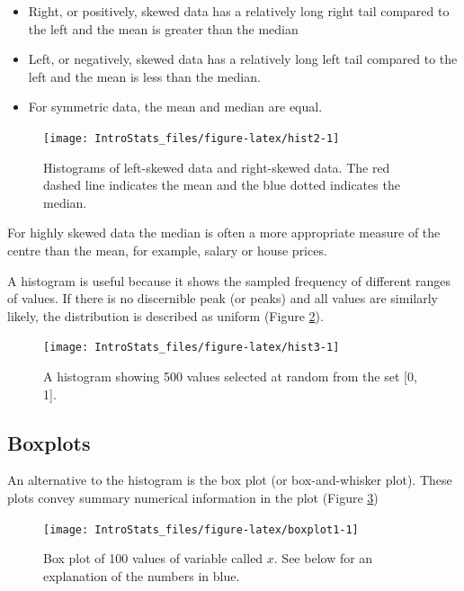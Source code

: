 \documentclass[
  oneside]{krantz}
\begin{document}
\begin{itemize}
\item
  Right, or positively, skewed data has a relatively long right tail compared to the left and the mean is greater than the median
\item
  Left, or negatively, skewed data has a relatively long left tail compared to the left and the mean is less than the median.
\item
  For symmetric data, the mean and median are equal.
\end{itemize}

\begin{figure}

{\centering \texttt{[image: IntroStats\_files/figure-latex/hist2-1]} 

}

\caption{Histograms of left-skewed data and right-skewed data. The red dashed line indicates the mean and the blue dotted indicates the median.}\label{fig:hist2}
\end{figure}

For highly skewed data the median is often a more appropriate measure of the centre than the mean, for example, salary or house prices.

A histogram is useful because it shows the sampled frequency of different ranges of values. If there is no discernible peak (or peaks) and all values are similarly likely, the distribution is described as uniform (Figure \ref{fig:hist3}).

\begin{figure}

{\centering \texttt{[image: IntroStats\_files/figure-latex/hist3-1]} 

}

\caption{A histogram showing 500 values selected at random from the set [0, 1].}\label{fig:hist3}
\end{figure}

\hypertarget{boxplots}{%
\subsection{Boxplots}\label{boxplots}}

An alternative to the histogram is the box plot (or box-and-whisker plot). These plots convey summary numerical information in the plot (Figure \ref{fig:boxplot1})

\begin{figure}

{\centering \texttt{[image: IntroStats\_files/figure-latex/boxplot1-1]} 

}

\caption{Box plot of 100 values of variable called $x$. See below for an explanation of the numbers in blue.}\label{fig:boxplot1}
\end{figure}
\end{document}
